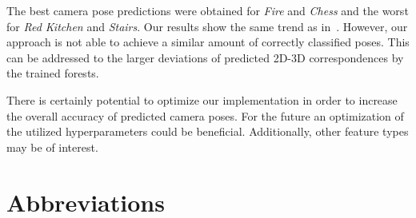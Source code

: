 \documentclass[final]{cvpr}
\begin{document}
The best camera pose predictions were obtained for \textit{Fire} and \textit{Chess} and the worst for \textit{Red Kitchen}
and \textit{Stairs}. Our results show the same trend as in~\cite{shotton2013}. However, our approach is not able
to achieve a similar amount of correctly classified poses. This can be addressed to the larger deviations of predicted
2D-3D correspondences by the trained forests. 

There is certainly potential to optimize our implementation in order to increase the overall accuracy of predicted camera poses.
For the future an optimization of the utilized hyperparameters could be beneficial. Additionally, other feature types may be 
of interest.

\section*{Abbreviations}
\begin{acronym}
\end{acronym}

{\small


}
\end{document}
